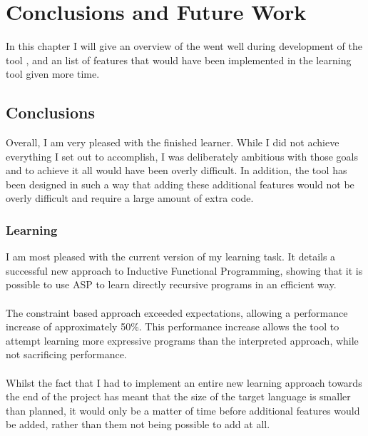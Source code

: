 \chapter{Conclusions and Future Work}

In this chapter I will give an overview of the went well during development of the tool , and an list of features that would have been implemented in the learning tool given more time.

\section{Conclusions}
Overall, I am very pleased with the finished learner. While I did not achieve everything I set out to accomplish, I was deliberately ambitious with those goals and to achieve it all would have been overly difficult.  In addition, the tool has been designed in such a way that adding these additional features would not be overly difficult and require a large amount of extra code.

\subsection{Learning}
I am most pleased with the current version of my learning task. It details a successful new approach to Inductive Functional Programming, showing that it is possible to use ASP to learn directly recursive programs in an efficient way.\\ \\
The constraint based approach exceeded expectations, allowing a performance increase of approximately 50\%. This performance increase allows the tool to attempt learning more expressive programs than the interpreted approach, while not sacrificing performance.\\ \\
Whilst the fact that I had to implement an entire new learning approach towards the end of the project has meant that the size of the target language is smaller than planned, it would only be a matter of time before additional features would be added, rather than them not being possible to add at all.

